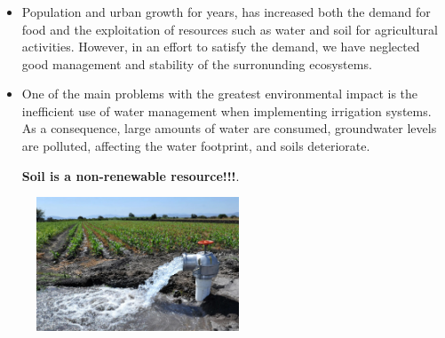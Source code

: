 \begin{frame}
	\frametitle{\secname}
	\begin{minipage}{0.6\textwidth}
		\begin{itemize}
			\item
				  Population and urban growth for years, has increased 
				  both the demand for food and the exploitation of resources
				  such as water and soil for agricultural activities. However, in an 
				  effort to satisfy the demand, we have neglected good management 
				  and stability of the surronunding ecosystems. \cite{Latham1997}

			\item

			One of the main problems with the greatest environmental 
			impact is the inefficient use of water management when 
			implementing irrigation systems. As a consequence, 
			large amounts of water are consumed, groundwater levels are 
			polluted, affecting the water footprint, and soils deteriorate.

			\textbf{Soil is a non-renewable resource!!!}.
		\end{itemize}
	\end{minipage}
	\begin{minipage}{0.37\textwidth}
		\begin{figure}[ht!]
			\centering
			\includegraphics[height=4cm]{wasted_water}
		\end{figure}
	\end{minipage}
\end{frame}


